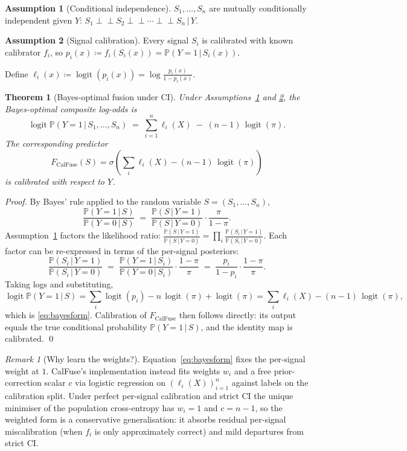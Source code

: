 \documentclass[11pt]{article}
\newtheorem{theorem}{Theorem}
\theoremstyle{definition}
\newtheorem{assumption}{Assumption}
\theoremstyle{remark}
\newtheorem*{remark}{Remark}
\newcommand{\pr}{\mathbb{P}}
\newcommand{\logit}{\operatorname{logit}}
\newcommand{\sig}{\sigma}
\newcommand{\indep}{\perp\!\!\!\perp}
\newcommand{\given}{\,\big|\,}
\begin{document}
\begin{assumption}[Conditional independence]\label{ass:ci}
$S_1, \ldots, S_n$ are mutually conditionally independent given $Y$:
$S_1 \indep S_2 \indep \cdots \indep S_n \given Y$.
\end{assumption}

\begin{assumption}[Signal calibration]\label{ass:cal}
Every signal $S_i$ is calibrated with known calibrator $f_i$, so
$p_i(x) \coloneqq f_i(S_i(x)) = \pr(Y = 1 \given S_i(x))$.
\end{assumption}

Define $\ell_i(x) \coloneqq \logit(p_i(x)) = \log\frac{p_i(x)}{1 - p_i(x)}$.

\begin{theorem}[Bayes-optimal fusion under CI]\label{thm:ci}
Under Assumptions~\ref{ass:ci} and \ref{ass:cal}, the Bayes-optimal composite
log-odds is
\begin{equation}\label{eq:bayesform}
\logit \pr(Y = 1 \given S_1, \ldots, S_n)
  \;=\; \sum_{i=1}^n \ell_i(X) \;-\; (n - 1)\,\logit(\pi).
\end{equation}
The corresponding predictor
\[
  F_{\mathrm{CalFuse}}(S) = \sig\!\left( \textstyle\sum_i \ell_i(X) - (n-1)\,\logit(\pi) \right)
\]
is calibrated with respect to $Y$.
\end{theorem}

\begin{proof}
By Bayes' rule applied to the random variable $S = (S_1, \ldots, S_n)$,
\[
  \frac{\pr(Y=1 \given S)}{\pr(Y=0 \given S)}
  \;=\; \frac{\pr(S \given Y=1)}{\pr(S \given Y=0)} \cdot \frac{\pi}{1-\pi}.
\]
Assumption~\ref{ass:ci} factors the likelihood ratio:
$\frac{\pr(S \given Y=1)}{\pr(S \given Y=0)} = \prod_i \frac{\pr(S_i \given Y=1)}{\pr(S_i \given Y=0)}$.
Each factor can be re-expressed in terms of the per-signal posteriors:
\[
  \frac{\pr(S_i \given Y=1)}{\pr(S_i \given Y=0)}
  \;=\; \frac{\pr(Y=1 \given S_i)}{\pr(Y=0 \given S_i)} \cdot \frac{1-\pi}{\pi}
  \;=\; \frac{p_i}{1-p_i} \cdot \frac{1-\pi}{\pi}.
\]
Taking logs and substituting,
\[
  \logit \pr(Y=1 \given S)
  = \sum_i \logit(p_i) - n\,\logit(\pi) + \logit(\pi)
  = \sum_i \ell_i(X) - (n-1)\,\logit(\pi),
\]
which is \eqref{eq:bayesform}. Calibration of $F_{\mathrm{CalFuse}}$ then
follows directly: its output equals the true conditional probability
$\pr(Y=1 \given S)$, and the identity map is calibrated. \qed
\end{proof}

\begin{remark}[Why learn the weights?]
Equation~\eqref{eq:bayesform} fixes the per-signal weight at $1$. CalFuse's
implementation instead fits weights $w_i$ and a free prior-correction
scalar $c$ via logistic regression on $(\ell_i(X))_{i=1}^n$ against labels on
the calibration split. Under perfect per-signal calibration and strict CI
the unique minimiser of the population cross-entropy has $w_i = 1$ and $c = n-1$,
so the weighted form is a conservative generalisation: it absorbs
residual per-signal miscalibration (when $f_i$ is only approximately correct)
and mild departures from strict CI.
\end{remark}
\end{document}
